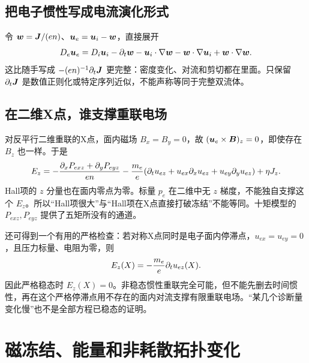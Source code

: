 \subsection{把电子惯性写成电流演化形式}
令 $\bm{w}=\bm{J}/(en)$、$\bm{u}_e=\bm{u}_i-\bm{w}$，直接展开
\begin{equation}
D_e\bm{u}_e=D_i\bm{u}_i-\partial_t\bm{w}-\bm{u}_i\cdot\nabla\bm{w}-\bm{w}\cdot\nabla\bm{u}_i+\bm{w}\cdot\nabla\bm{w}.\label{eq:inertiaexpanded}
\end{equation}
这比随手写成 $-(en)^{-1}\partial_t\bm{J}$ 更完整：密度变化、对流和剪切都在里面。只保留 $\partial_t\bm{J}$ 是数值正则化或特定序列近似，不能声称等同于完整双流体。

\subsection{在二维X点，谁支撑重联电场}
对反平行二维重联的X点，面内磁场 $B_x=B_y=0$，故 $(\bm{u}_e\times\bm{B})_z=0$，即使存在 $B_z$ 也一样。于是
\begin{equation}
E_z=-{\partial_xP_{exz}+\partial_yP_{eyz}\over en}
-{m_e\over e}(\partial_tu_{ez}+u_{ex}\partial_xu_{ez}+u_{ey}\partial_yu_{ez})+\eta J_z.\label{eq:xpoint}
\end{equation}
Hall项的 $z$ 分量也在面内零点为零。标量 $p_e$ 在二维中无 $z$ 梯度，不能独自支撑这个 $E_z$。所以“Hall项很大”与“Hall项在X点直接打破冻结”不能等同。十矩模型的 $P_{exz},P_{eyz}$ 提供了五矩所没有的通道。\citep{Wang2015}

还可得到一个有用的严格检查：若对称X点同时是电子面内停滞点，$u_{ex}=u_{ey}=0$，且压力标量、电阻为零，则
\begin{equation}E_z(X)=-{m_e\over e}\partial_tu_{ez}(X).
\end{equation}
因此严格稳态时 $E_z(X)=0$。非稳态惯性重联完全可能，但不能先删去时间惯性，再在这个严格停滞点用不存在的面内对流支撑有限重联电场。“某几个诊断量变化慢”也不是全部方程已稳态的证明。



\section{磁冻结、能量和非耗散拓扑变化}
